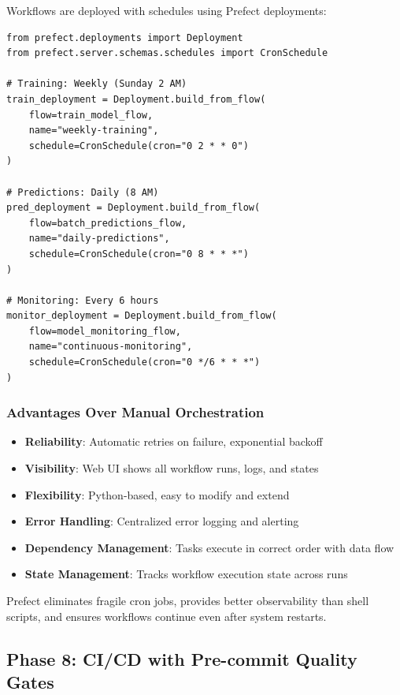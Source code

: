 Workflows are deployed with schedules using Prefect deployments:

\begin{lstlisting}[style=python, caption=Workflow Deployment]
from prefect.deployments import Deployment
from prefect.server.schemas.schedules import CronSchedule

# Training: Weekly (Sunday 2 AM)
train_deployment = Deployment.build_from_flow(
    flow=train_model_flow,
    name="weekly-training",
    schedule=CronSchedule(cron="0 2 * * 0")
)

# Predictions: Daily (8 AM)
pred_deployment = Deployment.build_from_flow(
    flow=batch_predictions_flow,
    name="daily-predictions",
    schedule=CronSchedule(cron="0 8 * * *")
)

# Monitoring: Every 6 hours
monitor_deployment = Deployment.build_from_flow(
    flow=model_monitoring_flow,
    name="continuous-monitoring",
    schedule=CronSchedule(cron="0 */6 * * *")
)
\end{lstlisting}

\subsubsection{Advantages Over Manual Orchestration}

\begin{itemize}
    \item \textbf{Reliability}: Automatic retries on failure, exponential backoff
    \item \textbf{Visibility}: Web UI shows all workflow runs, logs, and states
    \item \textbf{Flexibility}: Python-based, easy to modify and extend
    \item \textbf{Error Handling}: Centralized error logging and alerting
    \item \textbf{Dependency Management}: Tasks execute in correct order with data flow
    \item \textbf{State Management}: Tracks workflow execution state across runs
\end{itemize}

Prefect eliminates fragile cron jobs, provides better observability than shell scripts, and ensures workflows continue even after system restarts.

\subsection{Phase 8: CI/CD with Pre-commit Quality Gates}

